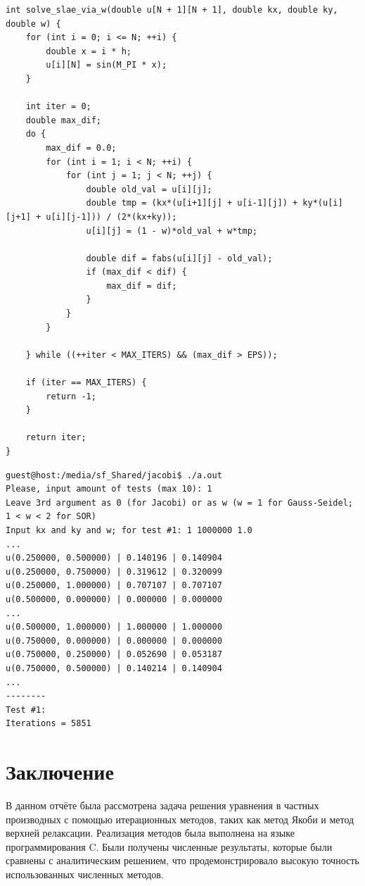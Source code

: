 \documentclass[a4paper, fleqn]{report}
\begin{document}
\lstset{language=bash}
\begin{lstlisting}[title={Реализация метода верхней релаксации}]
int solve_slae_via_w(double u[N + 1][N + 1], double kx, double ky, double w) {
    for (int i = 0; i <= N; ++i) {
        double x = i * h;
        u[i][N] = sin(M_PI * x);
    }

    int iter = 0;
    double max_dif;
    do {
        max_dif = 0.0;
        for (int i = 1; i < N; ++i) {
            for (int j = 1; j < N; ++j) {
                double old_val = u[i][j];
                double tmp = (kx*(u[i+1][j] + u[i-1][j]) + ky*(u[i][j+1] + u[i][j-1])) / (2*(kx+ky));
                u[i][j] = (1 - w)*old_val + w*tmp;

                double dif = fabs(u[i][j] - old_val);
                if (max_dif < dif) {
                    max_dif = dif;
                }
            }
        }

    } while ((++iter < MAX_ITERS) && (max_dif > EPS));

    if (iter == MAX_ITERS) {
        return -1;
    }

    return iter;
}
\end{lstlisting}

\lstset{language=bash}
\begin{lstlisting}[title={Вывод (для некоторых точек, покоординатно кратных 0.25)}]
guest@host:/media/sf_Shared/jacobi$ ./a.out
Please, input amount of tests (max 10): 1   
Leave 3rd argument as 0 (for Jacobi) or as w (w = 1 for Gauss-Seidel; 1 < w < 2 for SOR)
Input kx and ky and w; for test #1: 1 1000000 1.0
...
u(0.250000, 0.500000) | 0.140196 | 0.140904
u(0.250000, 0.750000) | 0.319612 | 0.320099
u(0.250000, 1.000000) | 0.707107 | 0.707107
u(0.500000, 0.000000) | 0.000000 | 0.000000
...
u(0.500000, 1.000000) | 1.000000 | 1.000000
u(0.750000, 0.000000) | 0.000000 | 0.000000
u(0.750000, 0.250000) | 0.052690 | 0.053187
u(0.750000, 0.500000) | 0.140214 | 0.140904
...
--------
Test #1:
Iterations = 5851
\end{lstlisting}


\chapter*{Заключение}

В данном отчёте была рассмотрена задача решения уравнения в частных производных с помощью итерационных методов, таких как метод Якоби и метод верхней релаксации. Реализация методов была выполнена на языке программирования C. Были получены численные результаты, которые были сравнены с аналитическим решением, что продемонстрировало высокую точность использованных численных методов.
\end{document}
